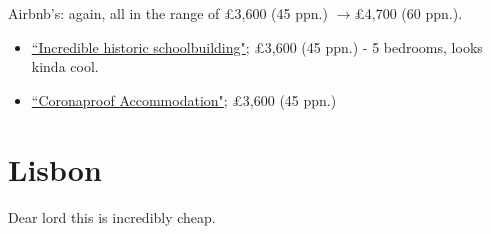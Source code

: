 \documentclass[12pt]{article}
\renewcommand{\to}{$\rightarrow$}
\newcommand{\cost}[2]{\pounds#1 (#2 ppn.)}
\begin{document}
	Airbnb's: again, all in the range of \cost{3,600}{45} \to \cost{4,700}{60}.
	\begin{itemize}
		\item \href{https://www.airbnb.co.uk/rooms/1648803?adults=10&check_in=2022-05-28&check_out=2022-06-05&federated_search_id=eacbb969-9448-48b4-b093-cfbc72c92868&source_impression_id=p3_1648314361_IUXtwtjrC12BznH9}{``Incredible historic schoolbuilding"}; \cost{3,600}{45} - 5 bedrooms, looks kinda cool.
		\item 
		\href{https://www.airbnb.co.uk/rooms/14224936?adults=10&check_in=2022-05-28&check_out=2022-06-05&federated_search_id=eacbb969-9448-48b4-b093-cfbc72c92868&source_impression_id=p3_1648314565_rybHsVBrlbjEOZeR}{``Coronaproof Accommodation"}; \cost{3,600}{45}
	\end{itemize}
	\section{Lisbon}
	Dear lord this is incredibly cheap.	
\end{document}
